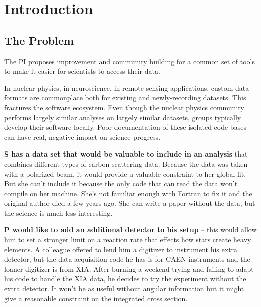 
\section{Introduction}\label{sec:overview}

\subsection{The Problem}
The PI proposes improvement and community building for a common set of tools to make it easier for scientists to access their data.

In nuclear physics, in neuroscience, in remote sensing applications, custom data formats are commonplace both for existing and newly-recording datasets.  This fractures the software ecosystem.  Even though the nuclear physics community performs largely similar analyses on largely similar datasets, groups typically develop their software locally.  Poor documentation of these isolated code bases can have real, negative impact on science progress. 
 



\textbf{S has a data set that would be valuable to include in an analysis} that combines different types of carbon scattering data.  Because the data was taken with a polarized beam, it would provide a valuable constraint to her global fit.  But she can't include it because the only code that can read the data won't compile on her machine.  She's not familiar enough with Fortran to fix it and the original author died a few years ago.  She can write a paper without the data, but the science is much less interesting. 
 
\textbf{P would like to add an additional detector to his setup} -- this would allow him to set a stronger limit on a reaction rate that effects how stars create heavy elements.  A colleague offered to lend him a digitizer to instrument his extra detector, but the data acquisition code he has is for CAEN instruments and the loaner digitizer is from XIA.  After burning a weekend trying and failing to adapt his code to handle the XIA data, he decides to try the experiment without the extra detector.  It won't be as useful without angular information but it might give a reasonable constraint on the integrated cross section.
 
